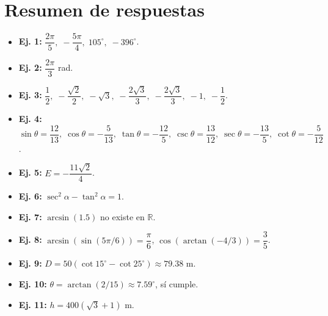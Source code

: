 \documentclass[12pt]{article}
\begin{document}
	\section*{Resumen de respuestas}
	\begin{itemize}
		\item \textbf{Ej. 1:} \(\dfrac{2\pi}{5},\; -\dfrac{5\pi}{4},\; 105^\circ,\; -396^\circ\).
		\item \textbf{Ej. 2:} \(\dfrac{2\pi}{3}\) rad.
		\item \textbf{Ej. 3:} \(\dfrac12,\; -\dfrac{\sqrt2}{2},\; -\sqrt3,\; -\dfrac{2\sqrt3}{3},\; -\dfrac{2\sqrt3}{3},\; -1,\; -\dfrac12\).
		\item \textbf{Ej. 4:} \(\sin\theta=\dfrac{12}{13},\; \cos\theta=-\dfrac{5}{13},\; \tan\theta=-\dfrac{12}{5},\; \csc\theta=\dfrac{13}{12},\; \sec\theta=-\dfrac{13}{5},\; \cot\theta=-\dfrac{5}{12}\).
		\item \textbf{Ej. 5:} \(E=-\dfrac{11\sqrt2}{4}\).
		\item \textbf{Ej. 6:} \(\sec^2\alpha-\tan^2\alpha=1\).
		\item \textbf{Ej. 7:} \(\arcsin(1.5)\) no existe en \(\mathbb{R}\).
		\item \textbf{Ej. 8:} \(\arcsin(\sin(5\pi/6))=\dfrac\pi6\), \quad \(\cos(\arctan(-4/3))=\dfrac35\).
		\item \textbf{Ej. 9:} \(D=50(\cot15^\circ-\cot25^\circ)\approx 79.38\text{ m}\).
		\item \textbf{Ej. 10:} \(\theta=\arctan(2/15)\approx 7.59^\circ\), sí cumple.
		\item \textbf{Ej. 11:} \(h=400(\sqrt3+1)\text{ m}\).
	\end{itemize}
	
\end{document}
